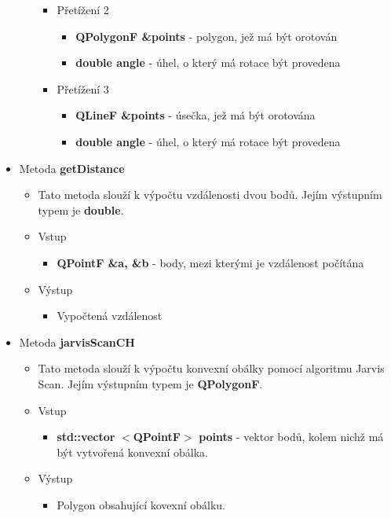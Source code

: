 \documentclass[a4paper, 12pt]{article}
\begin{document}
\begin{itemize}
\begin{itemize}
\begin{itemize}
					\item Přetížení 2
						\begin{itemize}
							\item \textbf{QPolygonF \&points} - polygon, jež má být orotován
							\item \textbf{double angle} - úhel, o který má rotace být provedena
 						\end{itemize}

					\item Přetížení 3
						\begin{itemize}
							\item \textbf{QLineF \&points} - úsečka, jež má být orotována
							\item \textbf{double angle} - úhel, o který má rotace být provedena
 						\end{itemize}					
				\end{itemize}
			
		\end{itemize}

	\item Metoda \textbf{getDistance}
		\begin{itemize}
			\item Tato metoda slouží k výpočtu vzdálenosti dvou bodů. Jejím výstupním typem je \textbf{double}.
			\item Vstup
				\begin{itemize}
					\item \textbf{QPointF \&a, \&b} - body, mezi kterými je vzdálenost počítána
				\end{itemize}
			\item Výstup
				\begin{itemize}	
					\item Vypočtená vzdálenost
				\end{itemize}
		\end{itemize}

	\item Metoda \textbf{jarvisScanCH}
		\begin{itemize}
			\item Tato metoda slouží k výpočtu konvexní obálky pomocí algoritmu Jarvis Scan. Jejím výstupním typem je \textbf{QPolygonF}.
			\item Vstup
				\begin{itemize}
					\item \textbf{std::vector} $<$\textbf{QPointF}$>$ \textbf{points} - vektor bodů, kolem nichž má být vytvořená konvexní obálka.
				\end{itemize}
			\item Výstup
				\begin{itemize}
					\item Polygon obsahující kovexní obálku.
				\end{itemize} 
		\end{itemize}


\end{itemize}
\end{document}
